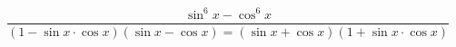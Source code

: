 \begin{ex}[type=expression]
	\begin{condition}
		\( \dfrac{\sin^6x-\cos^6x}{(1-\sin x\cdot\cos x)(\sin x-\cos x)=(\sin x+\cos x)(1+\sin x\cdot\cos x)} \)
	\end{condition}
\end{ex}